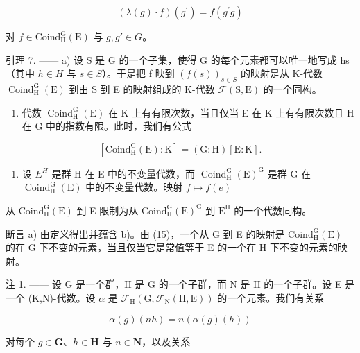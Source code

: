 \[
(\lambda (g) \cdot f) (g ^ {\prime}) = f (g ^ {\prime} g)\tag{15}
\]

对 \(f \in \text{Coind}_{\text{H}}^{\text{G}}(\text{E})\) 与 \(g, g' \in G\)。

引理 7. —— a) 设 S 是 G 的一个子集，使得 G 的每个元素都可以唯一地写成 hs（其中 \(h \in H\) 与 \(s \in S\)）。于是把 f 映到 \((f(s))_{s \in S}\) 的映射是从 K-代数 \(\operatorname{Coind}_{\mathrm{H}}^{\mathrm{G}}(\mathrm{E})\) 到由 S 到 E 的映射组成的 K-代数 \(\mathcal{F}(\mathrm{S}, \mathrm{E})\) 的一个同构。

\begin{enumerate}
\def\labelenumi{\alph{enumi})}
\setcounter{enumi}{1}
\tightlist
\item
  代数 \(\operatorname{Coind}_{\mathrm{H}}^{\mathrm{G}}(\mathrm{E})\) 在 K 上有有限次数，当且仅当 E 在 K 上有有限次数且 H 在 G 中的指数有限。此时，我们有公式
\end{enumerate}

\[
[ \mathrm{Coind} _ {\mathrm{H}} ^ {\mathrm{G}} (\mathrm{E}): \mathrm{K} ] = (\mathrm{G}: \mathrm{H}) [ \mathrm{E}: \mathrm{K} ].
\]

\begin{enumerate}
\def\labelenumi{\alph{enumi})}
\setcounter{enumi}{2}
\tightlist
\item
  设 \(E^{H}\) 是群 H 在 E 中的不变量代数，而 \(\operatorname{Coind}_{\mathrm{H}}^{\mathrm{G}}(\mathrm{E})^{\mathrm{G}}\) 是群 G 在 \(\operatorname{Coind}_{\mathrm{H}}^{\mathrm{G}}(\mathrm{E})\) 中的不变量代数。映射 \(f \mapsto f(e)\)
\end{enumerate}

从 \(\mathrm{Coind}_{\mathrm{H}}^{\mathrm{G}}(\mathrm{E})\) 到 E 限制为从 \(\mathrm{Coind}_{\mathrm{H}}^{\mathrm{G}}(\mathrm{E})^{\mathrm{G}}\) 到 \(\mathrm{E}^{\mathrm{H}}\) 的一个代数同构。

断言 a) 由定义得出并蕴含 b)。由 (15)，一个从 G 到 E 的映射是 \(\mathrm{Coind}_{\mathrm{H}}^{\mathrm{G}}(\mathrm{E})\) 的在 G 下不变的元素，当且仅当它是常值等于 E 的一个在 H 下不变的元素的映射。

注 1. —— 设 G 是一个群，H 是 G 的一个子群，而 N 是 H 的一个子群。设 E 是一个 (K,N)-代数。设 \(\alpha\) 是 \(\mathcal{F}_{\mathrm{H}}(\mathrm{G},\mathcal{F}_{\mathrm{N}}(\mathrm{H},\mathrm{E}))\) 的一个元素。我们有关系

\[
\alpha (g) (n h) = n (\alpha (g) (h))\tag{16}
\]

对每个 \(g \in \mathbf{G}\)、\(h \in \mathbf{H}\) 与 \(n \in \mathbf{N}\)，以及关系


